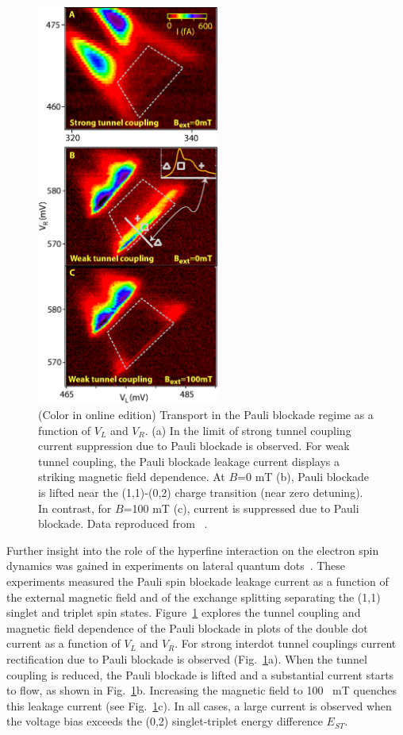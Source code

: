 \documentclass[rmp,twocolumn,aps]{revtex4}
\begin{document}
\begin{figure}[htb]
\begin{center}
\includegraphics[width=6cm]{hanson_fig38.eps}
\end{center}
\caption{(Color in online edition) Transport in the Pauli blockade regime
as a function of $V_L$ and $V_R$. (a) In the limit of strong
tunnel coupling current suppression due to Pauli blockade is
observed. For weak tunnel coupling, the Pauli blockade leakage
current displays a striking magnetic field dependence. At $B$=0 mT
(b), Pauli blockade is lifted near the (1,1)-(0,2) charge
transition (near zero detuning). In contrast, for $B$=100 mT (c),
current is suppressed due to Pauli blockade. Data
reproduced from ~\textcite{koppens05}.}%
\label{Fig:KoppensLeakage}
\end{figure}

Further insight into the role of the hyperfine interaction on the
electron spin dynamics was gained in experiments on lateral
quantum dots~\cite{koppens05}. These experiments measured the
Pauli spin blockade leakage current as a function of the external
magnetic field and of the exchange splitting separating the (1,1)
singlet and triplet spin states. Figure~\ref{Fig:KoppensLeakage}
explores the tunnel coupling and magnetic field dependence of the
Pauli blockade in plots of the double dot current as a function of
$V_L$ and $V_R$. For strong interdot tunnel couplings current
rectification due to Pauli blockade is observed
(Fig.~\ref{Fig:KoppensLeakage}a). When the tunnel coupling is
reduced, the Pauli blockade is lifted and a substantial current
starts to flow, as shown in Fig.~\ref{Fig:KoppensLeakage}b.
Increasing the magnetic field to 100~ mT quenches this leakage
current (see Fig.~\ref{Fig:KoppensLeakage}c). In all cases, a
large current is observed when the voltage bias exceeds the (0,2)
singlet-triplet energy difference $E_{ST}$.
\end{document}
